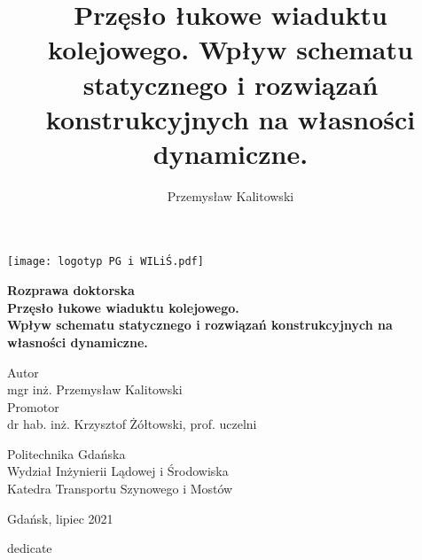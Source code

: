 
\title{Przęsło łukowe wiaduktu kolejowego. Wpływ schematu statycznego i rozwiązań konstrukcyjnych na własności dynamiczne.}
\author{Przemysław Kalitowski}










	
\begin{titlepage}
	\begin{center}
		\texttt{[image: logotyp PG i WILiŚ.pdf]}
		\vspace{3cm}
		
		\Large
		\textbf{Rozprawa doktorska\\}
		\vspace{1cm}
		\LARGE
		\textbf{Przęsło łukowe wiaduktu kolejowego.\\Wpływ schematu statycznego i rozwiązań konstrukcyjnych na własności dynamiczne.}
		
	
		\vspace{2cm}
		
		\large
		Autor\\mgr inż. Przemysław Kalitowski \\
		\vspace{0.5cm}
		Promotor\\dr hab. inż. Krzysztof Żółtowski, prof. uczelni
		\vfill
		

		\large
		
		Politechnika Gdańska\\
		Wydział Inżynierii Lądowej i Środowiska\\
		Katedra Transportu Szynowego i Mostów
		
		\vspace{1cm}
		Gdańsk, lipiec 2021
		
	\end{center}
\end{titlepage}


\myemptypage

\vspace*{20cm}
\hfill dedicate
\newpage

\myemptypage

\tableofcontents

